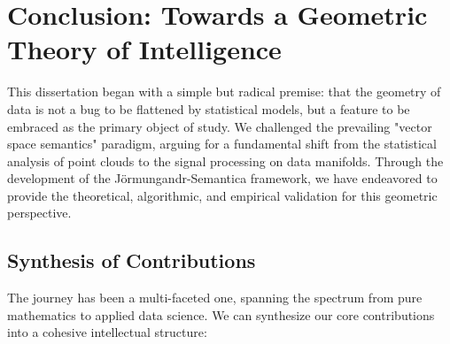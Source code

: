 \chapter{Conclusion: Towards a Geometric Theory of Intelligence}
\label{chap:conclusion}

This dissertation began with a simple but radical premise: that the geometry of data is not a bug to be flattened by statistical models, but a feature to be embraced as the primary object of study. We challenged the prevailing "vector space semantics" paradigm, arguing for a fundamental shift from the statistical analysis of point clouds to the signal processing on data manifolds. Through the development of the Jörmungandr-Semantica framework, we have endeavored to provide the theoretical, algorithmic, and empirical validation for this geometric perspective.

\section{Synthesis of Contributions}
The journey has been a multi-faceted one, spanning the spectrum from pure mathematics to applied data science. We can synthesize our core contributions into a cohesive intellectual structure:

